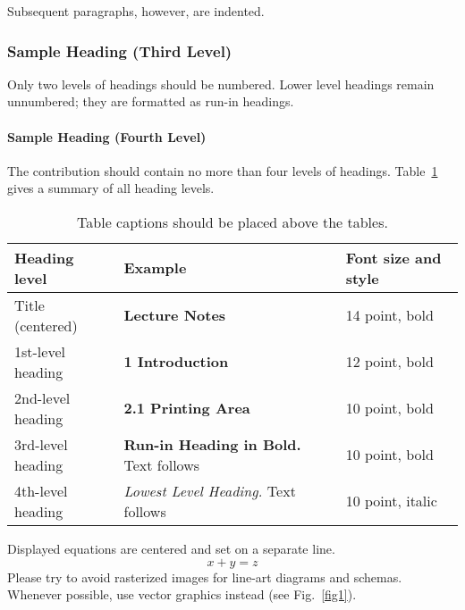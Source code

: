 \documentclass[runningheads]{llncs}
\begin{document}
Subsequent paragraphs, however, are indented.

\subsubsection{Sample Heading (Third Level)} Only two levels of
headings should be numbered. Lower level headings remain unnumbered;
they are formatted as run-in headings.

\paragraph{Sample Heading (Fourth Level)}
The contribution should contain no more than four levels of
headings. Table~\ref{tab1} gives a summary of all heading levels.

\begin{table}
\caption{Table captions should be placed above the
tables.}\label{tab1}
\begin{tabular}{|l|l|l|}
\hline
Heading level &  Example & Font size and style\\
\hline
Title (centered) &  {\Large\bfseries Lecture Notes} & 14 point, bold\\
1st-level heading &  {\large\bfseries 1 Introduction} & 12 point, bold\\
2nd-level heading & {\bfseries 2.1 Printing Area} & 10 point, bold\\
3rd-level heading & {\bfseries Run-in Heading in Bold.} Text follows & 10 point, bold\\
4th-level heading & {\itshape Lowest Level Heading.} Text follows & 10 point, italic\\
\hline
\end{tabular}
\end{table}


\noindent Displayed equations are centered and set on a separate
line.
\begin{equation}
x + y = z
\end{equation}
Please try to avoid rasterized images for line-art diagrams and
schemas. Whenever possible, use vector graphics instead (see
Fig.~\ref{fig1}).

\end{document}
